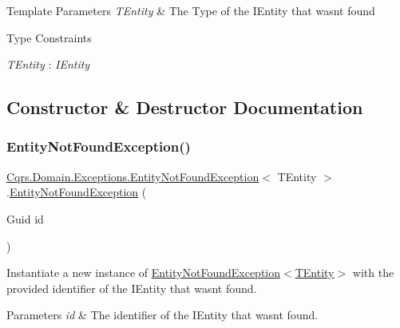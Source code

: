 \begin{DoxyTemplParams}{Template Parameters}
{\em T\+Entity} & The Type of the I\+Entity that wasn\textquotesingle{}t found\\
\hline
\end{DoxyTemplParams}
\begin{Desc}
\item[Type Constraints]\begin{description}
\item[{\em T\+Entity} : {\em I\+Entity}]\end{description}
\end{Desc}


\subsection{Constructor \& Destructor Documentation}
\mbox{\label{classCqrs_1_1Domain_1_1Exceptions_1_1EntityNotFoundException_ab62ed57aa319b92b5aebe6b34c69b177_ab62ed57aa319b92b5aebe6b34c69b177}} 
\subsubsection{\texorpdfstring{Entity\+Not\+Found\+Exception()}{EntityNotFoundException()}}
{\footnotesize\ttfamily \hyperlink{classCqrs_1_1Domain_1_1Exceptions_1_1EntityNotFoundException}{Cqrs.\+Domain.\+Exceptions.\+Entity\+Not\+Found\+Exception}$<$ T\+Entity $>$.\hyperlink{classCqrs_1_1Domain_1_1Exceptions_1_1EntityNotFoundException}{Entity\+Not\+Found\+Exception} (\begin{DoxyParamCaption}\item[{Guid}]{id }\end{DoxyParamCaption})}



Instantiate a new instance of \hyperlink{classCqrs_1_1Domain_1_1Exceptions_1_1EntityNotFoundException_ab62ed57aa319b92b5aebe6b34c69b177_ab62ed57aa319b92b5aebe6b34c69b177}{Entity\+Not\+Found\+Exception$<$\+T\+Entity$>$} with the provided identifier of the I\+Entity that wasn\textquotesingle{}t found. 


\begin{DoxyParams}{Parameters}
{\em id} & The identifier of the I\+Entity that wasn\textquotesingle{}t found.\\
\hline
\end{DoxyParams}
